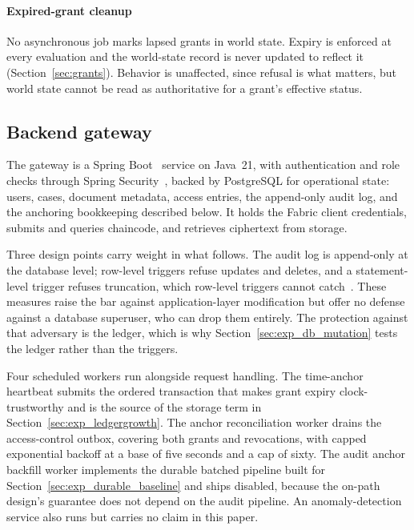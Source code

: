 \documentclass[preprint,12pt]{elsarticle}
\begin{document}
\paragraph{Expired-grant cleanup}
No asynchronous job marks lapsed grants in world state. Expiry is
enforced at every evaluation and the world-state record is never updated to
reflect it (Section~\ref{sec:grants}). Behavior is unaffected, since refusal is
what matters, but world state cannot be read as authoritative for a grant's
effective status.

\subsection{Backend gateway}
\label{sec:backend}

The gateway is a Spring Boot~\cite{springBoot325} service on Java~21, with
authentication and role checks through Spring
Security~\cite{springSecurity}, backed by PostgreSQL for operational state: users, cases, document metadata, access entries, the
append-only audit log, and the anchoring bookkeeping described below. It holds
the Fabric client credentials, submits and queries chaincode, and retrieves
ciphertext from storage.

Three design points carry weight in what follows. The audit log is
append-only at the database level; row-level triggers refuse updates and
deletes, and a statement-level trigger refuses truncation, which row-level
triggers cannot catch~\cite{postgresqlTriggers}. These measures raise the bar
against application-layer modification but offer no defense against a database
superuser, who can drop them entirely. The protection against that adversary is
the ledger, which is why Section~\ref{sec:exp_db_mutation} tests the ledger
rather than the triggers.

Four scheduled workers run alongside request handling. The time-anchor
heartbeat submits the ordered transaction that makes grant expiry
clock-trustworthy and is the source of the storage term in
Section~\ref{sec:exp_ledgergrowth}. The anchor reconciliation worker drains
the access-control outbox, covering both grants and revocations, with capped
exponential backoff at a base of five seconds and a cap of sixty. The audit
anchor backfill worker implements the durable batched pipeline built for
Section~\ref{sec:exp_durable_baseline} and ships disabled, because the
on-path design's guarantee does not depend on the audit pipeline. An
anomaly-detection service also runs but carries no claim in this paper.
\end{document}
